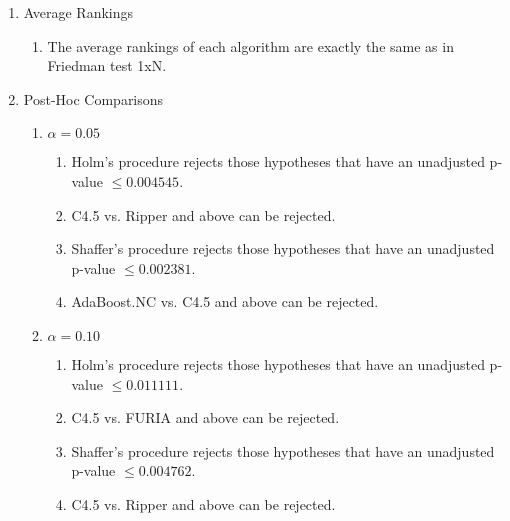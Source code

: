 \documentclass[a4paper,11pt]{article}
\begin{document}
\begin{enumerate}
\item Average Rankings
\begin{enumerate}
\item The average rankings of each algorithm are exactly the same as in Friedman test 1xN.
\end{enumerate}
\item Post-Hoc Comparisons
\begin{enumerate}
\item $\alpha = 0.05$
\begin{enumerate}
\item Holm's procedure rejects those hypotheses that have an unadjusted p-value $\le0.004545$.
\item C4.5 vs. Ripper and above can be rejected.
\item Shaffer's procedure rejects those hypotheses that have an unadjusted p-value $\le0.002381$.
\item AdaBoost.NC vs. C4.5 and above can be rejected.
\end{enumerate}
\item $\alpha = 0.10$
\begin{enumerate}
\item Holm's procedure rejects those hypotheses that have an unadjusted p-value $\le0.011111$.
\item C4.5 vs. FURIA and above can be rejected.
\item Shaffer's procedure rejects those hypotheses that have an unadjusted p-value $\le0.004762$.
\item C4.5 vs. Ripper and above can be rejected.
\end{enumerate}
\end{enumerate}
\end{enumerate}
\end{document}
